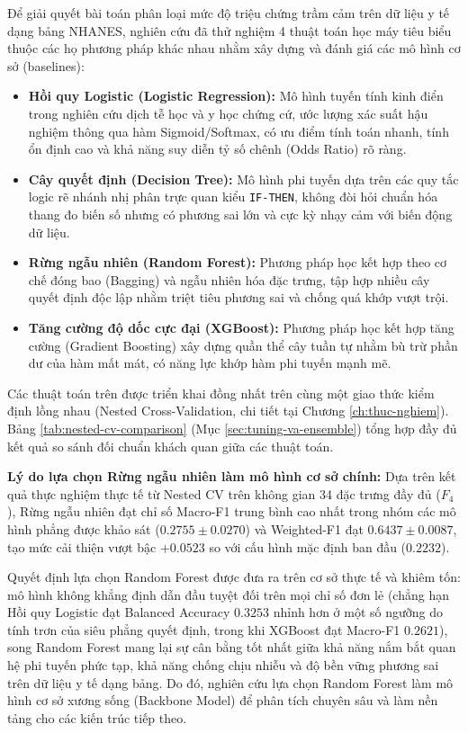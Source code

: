 Để giải quyết bài toán phân loại mức độ triệu chứng trầm cảm trên dữ liệu y tế dạng bảng NHANES, nghiên cứu đã thử nghiệm 4 thuật toán học máy tiêu biểu thuộc các họ phương pháp khác nhau nhằm xây dựng và đánh giá các mô hình cơ sở (baselines):
\begin{itemize}
    \item \textbf{Hồi quy Logistic (Logistic Regression):} Mô hình tuyến tính kinh điển trong nghiên cứu dịch tễ học và y học chứng cứ, ước lượng xác suất hậu nghiệm thông qua hàm Sigmoid/Softmax, có ưu điểm tính toán nhanh, tính ổn định cao và khả năng suy diễn tỷ số chênh (Odds Ratio) rõ ràng.
    \item \textbf{Cây quyết định (Decision Tree):} Mô hình phi tuyến dựa trên các quy tắc logic rẽ nhánh nhị phân trực quan kiểu \texttt{IF-THEN}, không đòi hỏi chuẩn hóa thang đo biến số nhưng có phương sai lớn và cực kỳ nhạy cảm với biến động dữ liệu.
    \item \textbf{Rừng ngẫu nhiên (Random Forest):} Phương pháp học kết hợp theo cơ chế đóng bao (Bagging) và ngẫu nhiên hóa đặc trưng, tập hợp nhiều cây quyết định độc lập nhằm triệt tiêu phương sai và chống quá khớp vượt trội.
    \item \textbf{Tăng cường độ dốc cực đại (XGBoost):} Phương pháp học kết hợp tăng cường (Gradient Boosting) xây dựng quần thể cây tuần tự nhằm bù trừ phần dư của hàm mất mát, có năng lực khớp hàm phi tuyến mạnh mẽ.
\end{itemize}

Các thuật toán trên được triển khai đồng nhất trên cùng một giao thức kiểm định lồng nhau (Nested Cross-Validation, chi tiết tại Chương \ref{ch:thuc-nghiem}). Bảng \ref{tab:nested-cv-comparison} (Mục \ref{sec:tuning-va-ensemble}) tổng hợp đầy đủ kết quả so sánh đối chuẩn khách quan giữa các thuật toán.

\textbf{Lý do lựa chọn Rừng ngẫu nhiên làm mô hình cơ sở chính:} Dựa trên kết quả thực nghiệm thực tế từ Nested CV trên không gian 34 đặc trưng đầy đủ ($F_4$), Rừng ngẫu nhiên đạt chỉ số Macro-F1 trung bình cao nhất trong nhóm các mô hình phẳng được khảo sát ($0.2755 \pm 0.0270$) và Weighted-F1 đạt $0.6437 \pm 0.0087$, tạo mức cải thiện vượt bậc $+0.0523$ so với cấu hình mặc định ban đầu ($0.2232$). 

Quyết định lựa chọn Random Forest được đưa ra trên cơ sở thực tế và khiêm tốn: mô hình không khẳng định dẫn đầu tuyệt đối trên mọi chỉ số đơn lẻ (chẳng hạn Hồi quy Logistic đạt Balanced Accuracy $0.3253$ nhỉnh hơn ở một số ngưỡng do tính trơn của siêu phẳng quyết định, trong khi XGBoost đạt Macro-F1 $0.2621$), song Random Forest mang lại sự cân bằng tốt nhất giữa khả năng nắm bắt quan hệ phi tuyến phức tạp, khả năng chống chịu nhiễu và độ bền vững phương sai trên dữ liệu y tế dạng bảng. Do đó, nghiên cứu lựa chọn Random Forest làm mô hình cơ sở xương sống (Backbone Model) để phân tích chuyên sâu và làm nền tảng cho các kiến trúc tiếp theo.

